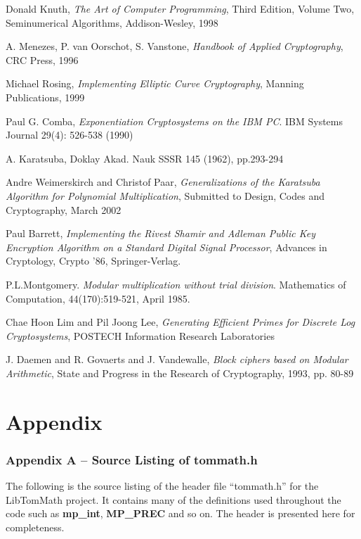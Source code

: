 \documentclass[b5paper]{book}
\begin{document}
\backmatter
\appendix
\begin{thebibliography}{ABCDEF}
Donald Knuth, \textit{The Art of Computer Programming}, Third Edition, Volume Two, Seminumerical Algorithms, Addison-Wesley, 1998

A. Menezes, P. van Oorschot, S. Vanstone, \textit{Handbook of Applied Cryptography}, CRC Press, 1996

Michael Rosing, \textit{Implementing Elliptic Curve Cryptography}, Manning Publications, 1999

Paul G. Comba, \textit{Exponentiation Cryptosystems on the IBM PC}. IBM Systems Journal 29(4): 526-538 (1990)

A. Karatsuba, Doklay Akad. Nauk SSSR 145 (1962), pp.293-294

Andre Weimerskirch and Christof Paar, \textit{Generalizations of the Karatsuba Algorithm for Polynomial Multiplication}, Submitted to Design, Codes and Cryptography, March 2002

Paul Barrett, \textit{Implementing the Rivest Shamir and Adleman Public Key Encryption Algorithm on a Standard Digital Signal Processor}, Advances in Cryptology, Crypto '86, Springer-Verlag.

P.L.Montgomery. \textit{Modular multiplication without trial division}. Mathematics of Computation, 44(170):519-521, April 1985.

Chae Hoon Lim and Pil Joong Lee, \textit{Generating Efficient Primes for Discrete Log Cryptosystems}, POSTECH Information Research Laboratories

J. Daemen and R. Govaerts and J. Vandewalle, \textit{Block ciphers based on Modular Arithmetic}, State and {P}rogress in the {R}esearch of {C}ryptography, 1993, pp. 80-89

\end{thebibliography}



\chapter{Appendix}
\subsection*{Appendix A -- Source Listing of tommath.h}

The following is the source listing of the header file ``tommath.h'' for the LibTomMath project.  It contains many of 
the definitions used throughout the code such as \textbf{mp\_int}, \textbf{MP\_PREC} and so on.  The header is 
presented here for completeness.
\end{document}
